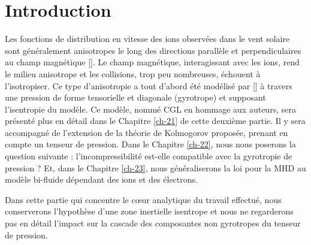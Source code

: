 \chapter*{Introduction}
 \adjustmtc
\renewcommand\partie{\Partie\ INTRO}
\label{ch-20}


Les fonctions de distribution en vitesse des ions observées dans le vent solaire sont généralement anisotropes le long des directions parallèle et perpendiculaires au champ magnétique [\cite{marsch_pronounced_1981,matteini_evolution_2007,bale_magnetic_2009}]. Le champ magnétique, interagissant avec les ions, rend le milieu anisotrope et les collisions, trop peu nombreuses, échouent à l'isotropiser. Ce type d'anisotropie a tout d'abord été modélisé par [\cite{chew_boltzmann_1956}] à travers une pression de forme tensorielle et diagonale (gyrotrope) et supposant l'isentropie du modèle. Ce modèle, nommé \acs{CGL} en hommage aux auteurs, sera présenté plus en détail dans le Chapitre \ref{ch-21} de cette deuxième partie. Il y sera accompagné de l'extension de la théorie de Kolmogorov proposée, prenant en compte un tenseur de pression. Dans le Chapitre \ref{ch-22}, nous nous poserons la question suivante : l'incompressibilité est-elle compatible avec la gyrotropie de pression ? Et, dans le Chapitre \ref{ch-23}, nous 
généraliserons la loi pour la \ac{MHD} au modèle bi-fluide dépendant des ions et des électrons.

Dans cette partie qui concentre le cœur analytique du travail effectué, nous conserverons l'hypothèse d'une zone inertielle isentrope et nous ne regarderons pas en détail l'impact sur la cascade des composantes non gyrotropes du tenseur de pression.
